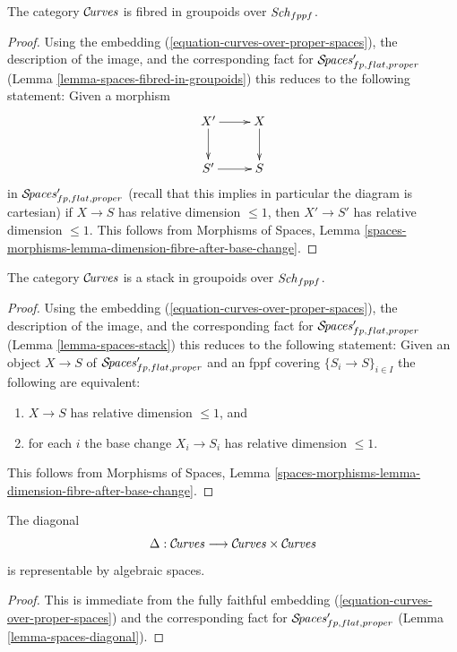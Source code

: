 \begin{lemma}
\label{lemma-curves-fibred-in-groupoids}
The category $\mathcal{C}\!\mathit{urves}$ is fibred in groupoids over $\mathit{Sch}_{fppf}$.
\end{lemma}

\begin{proof}
Using the embedding (\ref{equation-curves-over-proper-spaces}),
the description of the image, and
the corresponding fact for $\mathcal{S}\!\mathit{paces}'_{fp, flat, proper}$
(Lemma \ref{lemma-spaces-fibred-in-groupoids})
this reduces to the following statement: Given a morphism
$$
\xymatrix{
X' \ar[r] \ar[d] & X \ar[d] \\
S' \ar[r] & S
}
$$
in $\mathcal{S}\!\mathit{paces}'_{fp, flat, proper}$ (recall that this implies
in particular the diagram is cartesian)
if $X \to S$ has relative dimension $\leq 1$, then $X' \to S'$
has relative dimension $\leq 1$.
This follows from Morphisms of Spaces, Lemma
\ref{spaces-morphisms-lemma-dimension-fibre-after-base-change}.
\end{proof}

\begin{lemma}
\label{lemma-curves-stack}
The category $\mathcal{C}\!\mathit{urves}$ is a stack in groupoids over $\mathit{Sch}_{fppf}$.
\end{lemma}

\begin{proof}
Using the embedding (\ref{equation-curves-over-proper-spaces}),
the description of the image, and
the corresponding fact for $\mathcal{S}\!\mathit{paces}'_{fp, flat, proper}$
(Lemma \ref{lemma-spaces-stack})
this reduces to the following statement: Given an object
$X \to S$ of $\mathcal{S}\!\mathit{paces}'_{fp, flat, proper}$
and an fppf covering $\{S_i \to S\}_{i \in I}$
the following are equivalent:
\begin{enumerate}
\item $X \to S$ has relative dimension $\leq 1$, and
\item for each $i$ the base change $X_i \to S_i$
has relative dimension $\leq 1$.
\end{enumerate}
This follows from Morphisms of Spaces, Lemma
\ref{spaces-morphisms-lemma-dimension-fibre-after-base-change}.
\end{proof}

\begin{lemma}
\label{lemma-curves-diagonal}
The diagonal
$$
\Delta : \mathcal{C}\!\mathit{urves} \longrightarrow \mathcal{C}\!\mathit{urves} \times \mathcal{C}\!\mathit{urves}
$$
is representable by algebraic spaces.
\end{lemma}

\begin{proof}
This is immediate from the fully faithful embedding
(\ref{equation-curves-over-proper-spaces}) and
the corresponding fact for $\mathcal{S}\!\mathit{paces}'_{fp, flat, proper}$
(Lemma \ref{lemma-spaces-diagonal}).
\end{proof}

